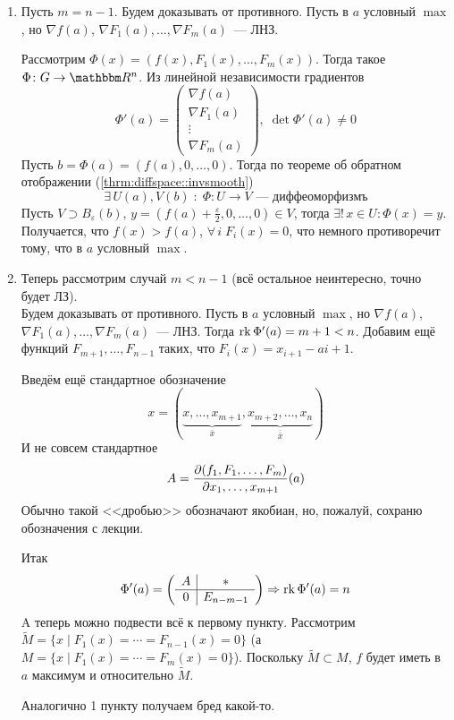 \documentclass[12pt,timbord]{../../../notes}
\begin{document}
\begin{ittproof}
  \begin{enumerate}
    \item Пусть $m = n - 1$. Будем доказывать от противного. Пусть в $a$ условный $\max$, но
      $\nabla f(a)$, $\nabla F_1(a), \dotsc, \nabla F_m(a)$~--- ЛНЗ.

      Рассмотрим $\Phi(x) = (f(x), F_1(x), \dotsc, F_m(x))$. Тогда такое $\Phi\colon G \to \R^n$.
      Из линейной независимости градиентов
      \[
        \Phi'(a) = \begin{pmatrix}
          \nabla f(a) \\ \nabla F_1(a) \\ \vdots \\ \nabla F_m(a) 
        \end{pmatrix}, \; \det \Phi'(a) \neq 0
      \]
      Пусть $b = \Phi(a) = (f(a), 0, \dotsc, 0)$. Тогда по теореме об обратном отображении 
      (\ref{thrm:diffspace::invsmooth}) 
      \[
        \exists\, U(a), V(b) \;\colon\; \Phi\colon U \to V \text{~--- диффеоморфизмъ}
      \]
      Пусть $V \supset B_\varepsilon(b)$, $y = (f(a)+ \frac{\varepsilon}{2}, 0, \dotsc, 0) \in V$, 
    тогда $\exists!\, x\in U \colon \Phi(x) = y$. Получается, что $f(x) > f(a)$, $\forall\, i\;
    F_i(x) = 0$, что немного противоречит тому, что в $a$ условный $\max$.
  \item Теперь рассмотрим случай $m < n - 1$ (всё остальное неинтересно, точно будет ЛЗ). \\
    Будем доказывать от противного. Пусть в $a$ условный $\max$, но
    $\nabla f(a)$, $\nabla F_1(a), \dotsc, \nabla F_m(a)$~--- ЛНЗ.
    Тогда $\operatorname{rk} \Phi'(a) = m+1 < n$. Добавим ещё функций $F_{m+1}, \dotsc, F_{n-1}$ таких, что
    $F_i(x) = x_{i+1} - a{i+1}$.

    Введём ещё стандартное обозначение
    \[
      x = (\underbrace{x, \dotsc, x_{m+1}}_{\bar{x}}, \underbrace{x_{m+2}, \dotsc,
      x_n}_{\bar{\bar{x}}})
    \]
    И не совсем стандартное
    \[
      A = \frac{\partial (f_1, F_1, \dotsc, F_m)}{\partial x_1, \dotsc, x_{m+1}}(a)
    \]
    Обычно такой <<дробью>> обозначают якобиан, но, пожалуй, сохраню обозначения с лекции.

    Итак
    \[
      \Phi'(a) = \left(
        \begin{array}{c|c}
          A & * \\
          \hline
          0 & E_{n-m-1}
        \end{array}
      \right) \Rightarrow \operatorname{rk} \Phi'(a) = n
    \]
    A теперь можно подвести всё к первому пункту.
    Рассмотрим $\widetilde{M} = \{x \mid F_1(x) = \cdots = F_{n-1}(x) = 0 \}$ (а 
    $M =  \{x \mid F_1(x) = \cdots = F_{m}(x) = 0 \}$). Поскольку $\widetilde{M} \subset M$,
    $f$ будет иметь в $a$ максимум и относительно $\widetilde{M}$.
    
    Аналогично 1 пункту получаем бред какой-то.
  \end{enumerate}
\end{ittproof}
\end{document}
